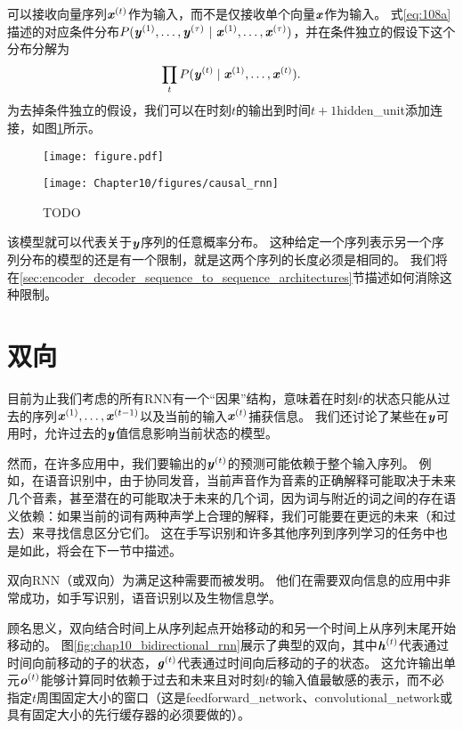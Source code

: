 
可以接收向量序列$\boldsymbol{\mathit{x}}^{(t)}$作为输入，而不是仅接收单个向量$\boldsymbol{\mathit{x}}$作为输入。
式\eqref{eq:108a}描述的对应条件分布$P(\boldsymbol{\mathit{y}}^{(1)}, \dots, \boldsymbol{\mathit{y}}^{(\tau)} ~|~ \boldsymbol{\mathit{x}}^{(1)}, \dots, \boldsymbol{\mathit{x}}^{(\tau)})$，并在条件独立的假设下这个分布分解为
\begin{align}
 \prod_t P(\boldsymbol{\mathit{y}}^{(t)} \mid \boldsymbol{\mathit{x}}^{(1)}, \dots, \boldsymbol{\mathit{x}}^{(t)}).
\end{align}
为去掉条件独立的假设，我们可以在时刻$t$的输出到时间$t+1$\gls{hidden_unit}添加连接，如图\ref{fig:chap10_causal_rnn}所示。
\begin{figure}[!htb]
\ifOpenSource
\centerline{\texttt{[image: figure.pdf]}}
\else
\centerline{\texttt{[image: Chapter10/figures/causal\_rnn]}}
\fi
\caption{TODO}
\label{fig:chap10_causal_rnn}
\end{figure}
该模型就可以代表关于$\boldsymbol{\mathit{y}}$序列的任意概率分布。
这种给定一个序列表示另一个序列分布的模型的还是有一个限制，就是这两个序列的长度必须是相同的。
我们将在\ref{sec:encoder_decoder_sequence_to_sequence_architectures}节描述如何消除这种限制。


\section{双向}
\label{sec:bidirectional_rnns}
目前为止我们考虑的所有\gls{RNN}有一个``因果''结构，意味着在时刻$t$的状态只能从过去的序列$\boldsymbol{\mathit{x}}^{(1)},\dots,\boldsymbol{\mathit{x}}^{(t-1)}$以及当前的输入$\boldsymbol{\mathit{x}}^{(t)}$捕获信息。
我们还讨论了某些在$\boldsymbol{\mathit{y}}$可用时，允许过去的$\boldsymbol{\mathit{y}}$值信息影响当前状态的模型。

然而，在许多应用中，我们要输出的$\boldsymbol{\mathit{y}}^{(t)}$的预测可能依赖于整个输入序列。
例如，在语音识别中，由于协同发音，当前声音作为音素的正确解释可能取决于未来几个音素，甚至潜在的可能取决于未来的几个词，因为词与附近的词之间的存在语义依赖：如果当前的词有两种声学上合理的解释，我们可能要在更远的未来（和过去）来寻找信息区分它们。
这在手写识别和许多其他序列到序列学习的任务中也是如此，将会在下一节中描述。

双向\gls{RNN}（或双向）为满足这种需要而被发明\citep{Schuster+Paliwal-1997}。
他们在需要双向信息的应用中非常成功\citep{Graves-book2012}，如手写识别\citep{Graves-et-al-NIPS2007,Graves+Schmidhuber-2009}，语音识别\citep{Graves+Schmidhuber-2005,Graves-et-al-ICASSP2013}以及生物信息学\citep{Baldi-et-al-1999}。

顾名思义，双向结合时间上从序列起点开始移动的和另一个时间上从序列末尾开始移动的。
图\ref{fig:chap10_bidirectional_rnn}展示了典型的双向，其中$\boldsymbol{\mathit{h}}^{(t)}$代表通过时间向前移动的子的状态，$\boldsymbol{\mathit{g}}^{(t)}$代表通过时间向后移动的子的状态。
这允许输出单元$\boldsymbol{\mathit{o}}^{(t)}$能够计算同时依赖于过去和未来且对时刻$t$的输入值最敏感的表示，而不必指定$t$周围固定大小的窗口（这是\gls{feedforward_network}、\gls{convolutional_network}或具有固定大小的先行缓存器的必须要做的）。


